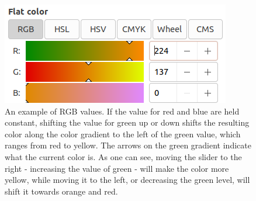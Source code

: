 \begin{figure}[H]
\centering
\includegraphics[width=0.6\linewidth]{figures/rgb-1}
\caption[An Example of RGB Color Values]{An example of RGB values.  If the value for red and blue are held constant, shifting the value for green up or down shifts the resulting color along the color gradient to the left of the green value, which ranges from red to yellow.  The arrows on the green gradient indicate what the current color is.  As one can see, moving the slider to the right - increasing the value of green - will make the color more yellow, while moving it to the left, or decreasing the green level, will shift it towards orange and red.}
\label{fig:rgb-1}
\end{figure}